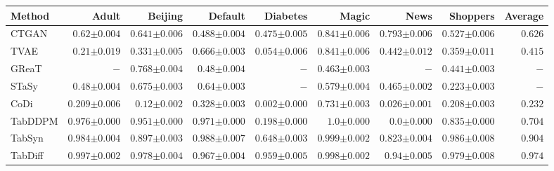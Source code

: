 \begin{tabular}{lrrrrrrr|r}
    \toprule[0.8pt]
     \textbf{Method} & \textbf{Adult} & \textbf{Beijing} & \textbf{Default} & \textbf{Diabetes} & \textbf{Magic} & \textbf{News} & \textbf{Shoppers} & \textbf{Average} \\
    \midrule 
    CTGAN & $0.62${\tiny${\pm 0.004}$} & $0.641${\tiny${\pm 0.006}$} & $0.488${\tiny${\pm 0.004}$} & $0.475${\tiny${\pm 0.005}$} & $0.841${\tiny${\pm 0.006}$} & $0.793${\tiny${\pm 0.006}$} & $0.527${\tiny${\pm 0.006}$} & $0.626$ \\
    TVAE & $0.21${\tiny${\pm 0.019}$} & $0.331${\tiny${\pm 0.005}$} & $0.666${\tiny${\pm 0.003}$} & $0.054${\tiny${\pm 0.006}$} & $0.841${\tiny${\pm 0.006}$} & $0.442${\tiny${\pm 0.012}$} & $0.359${\tiny${\pm 0.011}$} & $0.415$ \\
    GReaT & $-$ & $0.768${\tiny${\pm 0.004}$} & $0.48${\tiny${\pm 0.004}$} & $-$ & $0.463${\tiny${\pm 0.003}$} & $-$ & $0.441${\tiny${\pm 0.003}$} & $-$ \\
    STaSy & $0.48${\tiny${\pm 0.004}$} & $0.675${\tiny${\pm 0.003}$} & $0.64${\tiny${\pm 0.003}$} & $-$ & $0.579${\tiny${\pm 0.004}$} & $0.465${\tiny${\pm 0.002}$} & $0.223${\tiny${\pm 0.003}$} & $-$ \\
    CoDi & $0.209${\tiny${\pm 0.006}$} & $0.12${\tiny${\pm 0.002}$} & $0.328${\tiny${\pm 0.003}$} & $0.002${\tiny${\pm 0.000}$} & $0.731${\tiny${\pm 0.003}$} & $0.026${\tiny${\pm 0.001}$} & $0.208${\tiny${\pm 0.003}$} & $0.232$ \\
    TabDDPM & $0.976${\tiny${\pm 0.000}$} & $0.951${\tiny${\pm 0.000}$} & $0.971${\tiny${\pm 0.000}$} & $0.198${\tiny${\pm 0.000}$} & $1.0${\tiny${\pm 0.000}$} & $0.0${\tiny${\pm 0.000}$} & $0.835${\tiny${\pm 0.000}$} & $0.704$ \\    
    TabSyn & $0.984${\tiny${\pm 0.004}$} & $0.897${\tiny${\pm 0.003}$} & $0.988${\tiny${\pm 0.007}$} & $0.648${\tiny${\pm 0.003}$} & $0.999${\tiny${\pm 0.002}$} & $0.823${\tiny${\pm 0.004}$} & $0.986${\tiny${\pm 0.008}$} & $0.904$ \\
    TabDiff & $0.997${\tiny${\pm 0.002}$} & $0.978${\tiny${\pm 0.004}$} & $0.967${\tiny${\pm 0.004}$} & $0.959${\tiny${\pm 0.005}$} & $0.998${\tiny${\pm 0.002}$} & $0.94${\tiny${\pm 0.005}$} & $0.979${\tiny${\pm 0.008}$} & $0.974$ \\

\end{tabular}
